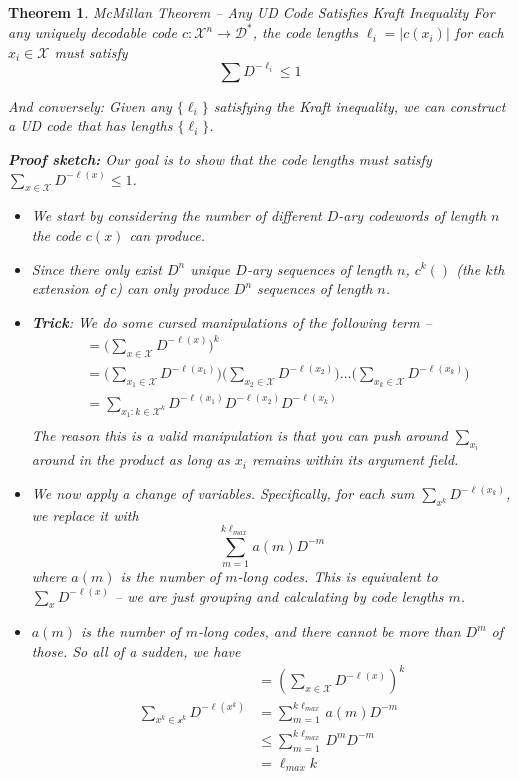 \documentclass[a4paper,12pt]{report}
\newtheorem{theorem}{Theorem}
\begin{document}
\begin{theorem}{McMillan Theorem -- Any UD Code Satisfies Kraft Inequality}
For any uniquely decodable code $c: \mathcal X^n \to \mathcal D^*$, the code
lengths $\ell_i = |c(x_i)|$ for each $x_i \in \mathcal X$ must satisfy 
\begin{equation}
	\sum D^{-\ell_i} \leq 1
\end{equation}

And conversely: Given any $\{\ell_i\}$ satisfying the Kraft inequality, we can
construct a UD code that has lengths $\{\ell_i\}$.

\textbf{Proof sketch:} Our goal is to show that the code lengths must satisfy
$\sum_{x\in \mathcal X} D^{-\ell(x)} \leq 1$.
\begin{itemize}
\item We start by considering the number of different $D$-ary codewords of
length $n$ the code $c(x)$ can produce.
\item Since there only exist $D^n$ unique $D$-ary sequences of length $n$,
$c^k()$ (the $k$th extension of $c$) can only produce $D^n$ sequences of length
$n$.
\item \textbf{Trick}: We do some cursed manipulations of the following term -- 
\begin{align}
	&= \big(\sum_{x\in \mathcal X} D^{-\ell(x)} \big)^k \\ 
	&= \big(\sum_{x_1 \in \mathcal X} D^{-\ell(x_1)} \big) \big(\sum_{x_2 \in
	\mathcal X} D^{-\ell(x_2)} \big) \dots \big(\sum_{x_k \in \mathcal X}
	D^{-\ell(x_k)} \big) \\
	&= \sum_{x_1:k \in \mathcal X^k} D^{-\ell(x_1)}D^{-\ell(x_2)}D^{-\ell(x_k)}\\
\end{align}
The reason this is a valid manipulation is that you can push around $\sum_{x_i}$
around in the product as long as $x_i$ remains within its argument field. 

\item We now apply a change of variables. Specifically, for each sum $\sum_{x^k}
D^{-\ell (x_k)}$, we replace it with $$\sum_{m=1}^{k \ell_{max}} a(m) D^{-m}$$ where
$a(m)$ is the number of $m$-long codes. This is equivalent to $\sum_x
D^{-\ell(x)}$ -- we are just grouping and calculating by code lengths $m$. 

\item $a(m)$ is the number of $m$-long codes, and there cannot be more than
$D^m$ of those. So all of a sudden, we have 
	\begin{align}
		&= (\sum_{x\in \mathcal X} D^{-\ell(x)})^k \\ 
		\sum_{x^k \in \mathcal x^k} D^{-\ell(x^k)} &= \sum_{m=1}^{k \ell_{max}}
		a(m) D^{-m} \\ 
		& \leq \sum_{m=1}^{k \ell_{max}} D^m D^{-m} \\ 
		&= \ell_{max} k
	\end{align}


\end{itemize}
\end{theorem}
\end{document}
